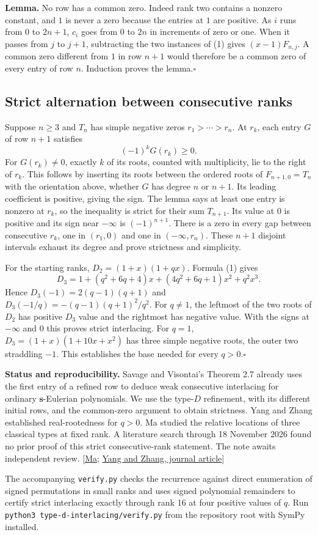 \documentclass[11pt]{article}
\newcommand{\done}{\hfill\(\square\)}
\begin{document}
\textbf{Lemma.} No row has a common zero. Indeed rank two contains a nonzero constant, and $1$ is never a zero because the entries at $1$ are positive. As $i$ runs from $0$ to $2n+1$, $c_i$ goes from $0$ to $2n$ in increments of zero or one. When it passes from $j$ to $j+1$, subtracting the two instances of (1) gives $(x-1)F_{n,j}$. A common zero different from $1$ in row $n+1$ would therefore be a common zero of every entry of row $n$. Induction proves the lemma.\done

\subsection*{Strict alternation between consecutive ranks}
Suppose $n\ge3$ and $T_n$ has simple negative zeros $r_1>\cdots>r_n$. At $r_k$, each entry $G$ of row $n+1$ satisfies
\[
                     (-1)^k G(r_k)\ge0 .
\]
For $G(r_k)\ne0$, exactly $k$ of its roots, counted with multiplicity, lie to the right of $r_k$. This follows by inserting its roots between the ordered roots of $F_{n+1,0}=T_n$ with the orientation above, whether $G$ has degree $n$ or $n+1$. Its leading coefficient is positive, giving the sign. The lemma says at least one entry is nonzero at $r_k$, so the inequality is strict for their sum $T_{n+1}$. Its value at $0$ is positive and its sign near $-\infty$ is $(-1)^{n+1}$. There is a zero in every gap between consecutive $r_k$, one in $(r_1,0)$ and one in $(-\infty,r_n)$. These $n+1$ disjoint intervals exhaust its degree and prove strictness and simplicity.

For the starting ranks, $D_2=(1+x)(1+qx)$. Formula (1) gives
\[
 D_3=1+(q^2+6q+4)x+(4q^2+6q+1)x^2+q^2x^3.
\]
Hence $D_3(-1)=2(q-1)(q+1)$ and $D_3(-1/q)=-(q-1)(q+1)^2/q^2$. For $q\ne1$, the leftmost of the two roots of $D_2$ has positive $D_3$ value and the rightmost has negative value. With the signs at $-\infty$ and $0$ this proves strict interlacing. For $q=1$, $D_3=(1+x)(1+10x+x^2)$ has three simple negative roots, the outer two straddling $-1$. This establishes the base needed for every $q>0$.\done

\small
\textbf{Status and reproducibility.} Savage and Visontai's Theorem 2.7 already uses the first entry of a refined row to deduce weak consecutive interlacing for ordinary $\mathbf{s}$-Eulerian polynomials. We use the type-$D$ refinement, with its different initial rows, and the common-zero argument to obtain strictness. Yang and Zhang established real-rootedness for $q>0$. Ma studied the relative locations of three classical types at fixed rank. A literature search through 18 November 2026 found no prior proof of this strict consecutive-rank statement. The note awaits independent review. [\href{https://arxiv.org/abs/2608.02357}{Ma}; \href{https://doi.org/10.1137/16M1084651}{Yang and Zhang, journal article}]

The accompanying \texttt{verify.py} checks the recurrence against direct enumeration of signed permutations in small ranks and uses signed polynomial remainders to certify strict interlacing exactly through rank 16 at four positive values of $q$. Run \texttt{python3 type-d-interlacing/verify.py} from the repository root with SymPy installed.
\end{document}
